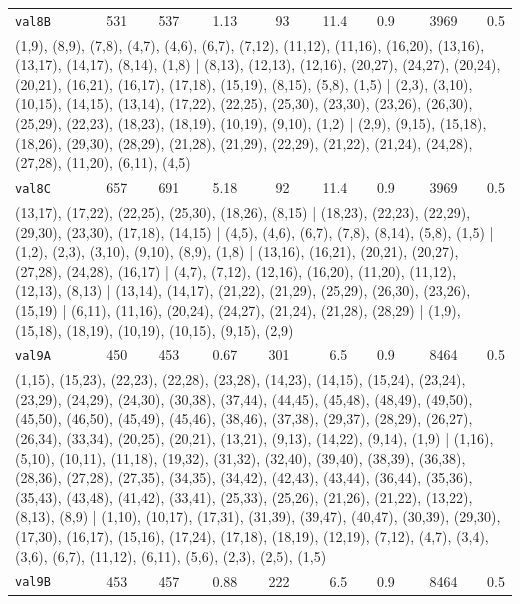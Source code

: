 \begin{longtable}{lrrrrrrrr}
\texttt{val8B} & 531 & 537 & 1.13 & 93 & 11.4 & 0.9 & 3969 & 0.5 \\
\multicolumn{9}{p{0.96\linewidth}}{\tiny\raggedright\arraybackslash (1,9), (8,9), (7,8), (4,7), (4,6), (6,7), (7,12), (11,12), (11,16), (16,20), (13,16), (13,17), (14,17), (8,14), (1,8) | (8,13), (12,13), (12,16), (20,27), (24,27), (20,24), (20,21), (16,21), (16,17), (17,18), (15,19), (8,15), (5,8), (1,5) | (2,3), (3,10), (10,15), (14,15), (13,14), (17,22), (22,25), (25,30), (23,30), (23,26), (26,30), (25,29), (22,23), (18,23), (18,19), (10,19), (9,10), (1,2) | (2,9), (9,15), (15,18), (18,26), (29,30), (28,29), (21,28), (21,29), (22,29), (21,22), (21,24), (24,28), (27,28), (11,20), (6,11), (4,5)} \\[2pt]
\texttt{val8C} & 657 & 691 & 5.18 & 92 & 11.4 & 0.9 & 3969 & 0.5 \\
\multicolumn{9}{p{0.96\linewidth}}{\tiny\raggedright\arraybackslash (13,17), (17,22), (22,25), (25,30), (18,26), (8,15) | (18,23), (22,23), (22,29), (29,30), (23,30), (17,18), (14,15) | (4,5), (4,6), (6,7), (7,8), (8,14), (5,8), (1,5) | (1,2), (2,3), (3,10), (9,10), (8,9), (1,8) | (13,16), (16,21), (20,21), (20,27), (27,28), (24,28), (16,17) | (4,7), (7,12), (12,16), (16,20), (11,20), (11,12), (12,13), (8,13) | (13,14), (14,17), (21,22), (21,29), (25,29), (26,30), (23,26), (15,19) | (6,11), (11,16), (20,24), (24,27), (21,24), (21,28), (28,29) | (1,9), (15,18), (18,19), (10,19), (10,15), (9,15), (2,9)} \\[2pt]
\texttt{val9A} & 450 & 453 & 0.67 & 301 & 6.5 & 0.9 & 8464 & 0.5 \\
\multicolumn{9}{p{0.96\linewidth}}{\tiny\raggedright\arraybackslash (1,15), (15,23), (22,23), (22,28), (23,28), (14,23), (14,15), (15,24), (23,24), (23,29), (24,29), (24,30), (30,38), (37,44), (44,45), (45,48), (48,49), (49,50), (45,50), (46,50), (45,49), (45,46), (38,46), (37,38), (29,37), (28,29), (26,27), (26,34), (33,34), (20,25), (20,21), (13,21), (9,13), (14,22), (9,14), (1,9) | (1,16), (5,10), (10,11), (11,18), (19,32), (31,32), (32,40), (39,40), (38,39), (36,38), (28,36), (27,28), (27,35), (34,35), (34,42), (42,43), (43,44), (36,44), (35,36), (35,43), (43,48), (41,42), (33,41), (25,33), (25,26), (21,26), (21,22), (13,22), (8,13), (8,9) | (1,10), (10,17), (17,31), (31,39), (39,47), (40,47), (30,39), (29,30), (17,30), (16,17), (15,16), (17,24), (17,18), (18,19), (12,19), (7,12), (4,7), (3,4), (3,6), (6,7), (11,12), (6,11), (5,6), (2,3), (2,5), (1,5)} \\[2pt]
\texttt{val9B} & 453 & 457 & 0.88 & 222 & 6.5 & 0.9 & 8464 & 0.5 \\

\end{longtable}
